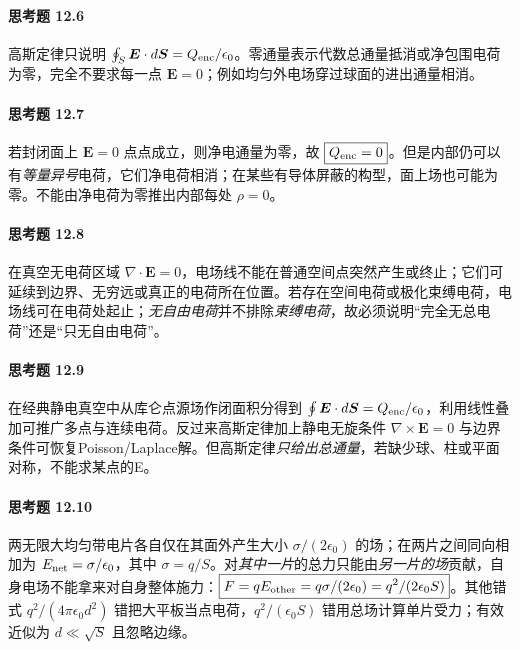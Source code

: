 \paragraph{思考题 12.6}
高斯定律只说明 \(\oint_S\boldsymbol E\cdot d\boldsymbol S=Q_{\rm enc}/\epsilon_0\)。零通量表示代数总通量抵消或净包围电荷为零，完全不要求每一点 \(\boldsymbol E=0\)；例如均匀外电场穿过球面的进出通量相消。

\paragraph{思考题 12.7}
若封闭面上 \(\boldsymbol E=0\) 点点成立，则净电通量为零，故 \(\boxed{Q_{\rm enc}=0}\)。但是内部仍可以有\emph{等量异号}电荷，它们净电荷相消；在某些有导体屏蔽的构型，面上场也可能为零。不能由净电荷为零推出内部每处 \(\rho=0\)。

\paragraph{思考题 12.8}
在真空无电荷区域 \(\nabla\cdot\boldsymbol E=0\)，电场线不能在普通空间点突然产生或终止；它们可延续到边界、无穷远或真正的电荷所在位置。若存在空间电荷或极化束缚电荷，电场线可在电荷处起止；\emph{无自由电荷}并不排除\emph{束缚电荷}，故必须说明“完全无总电荷”还是“只无自由电荷”。

\paragraph{思考题 12.9}
在经典静电真空中从库仑点源场作闭面积分得到 \(\oint\boldsymbol E\cdot d\boldsymbol S=Q_{\rm enc}/\epsilon_0\)，利用线性叠加可推广多点与连续电荷。反过来高斯定律加上静电无旋条件 \(\nabla\times\boldsymbol E=0\) 与边界条件可恢复Poisson/Laplace解。但高斯定律\emph{只给出总通量}，若缺少球、柱或平面对称，不能求某点的E。

\paragraph{思考题 12.10}
两无限大均匀带电片各自仅在其面外产生大小 \(\sigma/(2\epsilon_0)\) 的场；在两片之间同向相加为 \(E_{\rm net}=\sigma/\epsilon_0\)，其中 \(\sigma=q/S\)。对\emph{其中一片}的总力只能由\emph{另一片的场}贡献，自身电场不能拿来对自身整体施力：\(\boxed{F=q E_{\rm other}=q\sigma/(2\epsilon_0)=q^2/(2\epsilon_0 S)}\)。其他错式 \(q^2/(4\pi\epsilon_0d^2)\) 错把大平板当点电荷，\(q^2/(\epsilon_0S)\) 错用总场计算单片受力；有效近似为 \(d\ll\sqrt S\) 且忽略边缘。
